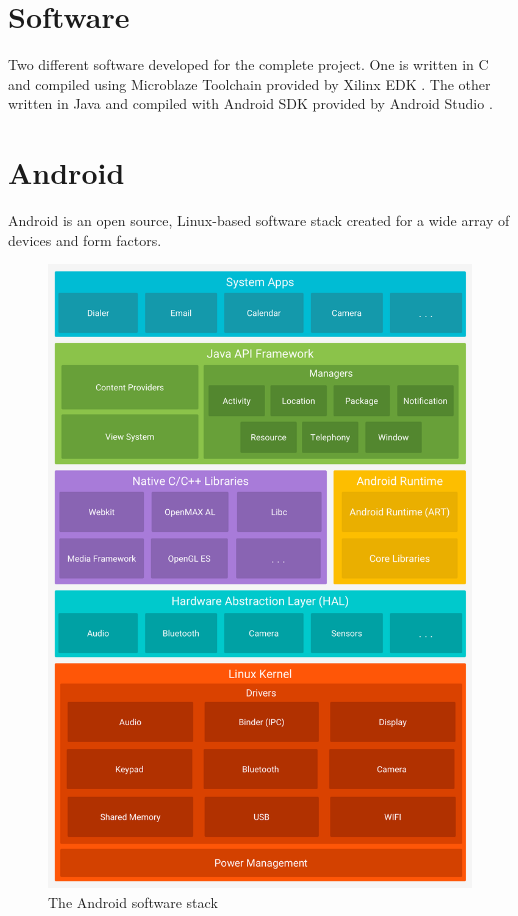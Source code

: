 \section{Software}

Two different software developed for the complete project. One is written in C and compiled using Microblaze Toolchain provided by Xilinx EDK \cite{xilinx-xps-edk}. The other written in Java and compiled with Android SDK provided by Android Studio \cite{android-studio}. 

\section{Android}
Android is an open source, Linux-based software stack created for a wide array of devices and form factors.

\begin{figure}
	\centering
	\includegraphics[scale=0.1]{images/android-stack.png}
	\caption{The Android software stack}
\end{figure}

